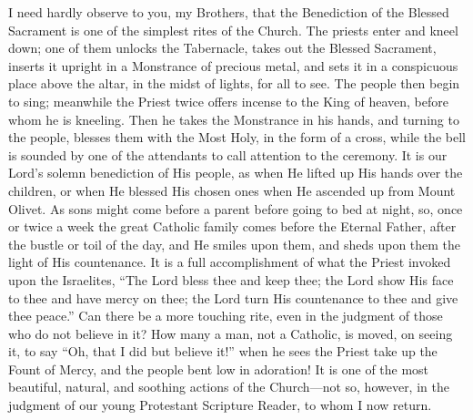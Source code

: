 I need hardly observe to you, my Brothers, that the
Benediction of the Blessed Sacrament is one of the
simplest rites of the Church. The priests enter and kneel
down; one of them unlocks the Tabernacle, takes out the
Blessed Sacrament, inserts it upright in a Monstrance of
precious metal, and sets it in a conspicuous place above
the altar, in the midst of lights, for all to see. The
people then begin to sing; meanwhile the Priest twice
offers incense to the King of heaven, before whom he is
kneeling. Then he takes the Monstrance in his hands, and
turning to the people, blesses them with the Most Holy,
in the form of a cross, while the bell is sounded by one
of the attendants to call attention to the ceremony. It
is our Lord's solemn benediction of His people, as when
He lifted up His hands over the children, or when He
blessed His chosen ones when He ascended up from Mount
Olivet. As sons might come before a parent before going
to bed at night, so, once or twice a week the great
Catholic family comes before the Eternal Father, after
the bustle or toil of the day, and He smiles upon them,
and sheds upon them the light of His countenance. It is a
full accomplishment of what the Priest invoked upon the
Israelites, ``The Lord bless thee and keep thee; the
Lord show His face to thee and have mercy on thee; the
Lord turn His countenance to thee and give thee
peace.'' Can there be a more touching rite, even in
the judgment of those who do not believe in it? How many a man, not a Catholic, is moved, on seeing it, to say
``Oh, that I did but believe it!'' when he sees
the Priest take up the Fount of Mercy, and the people
bent low in adoration! It is one of the most beautiful,
natural, and soothing actions of the Church—not so,
however, in the judgment of our young Protestant
Scripture Reader, to whom I now return.

